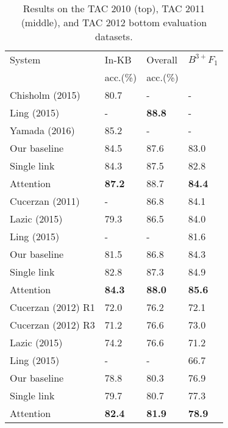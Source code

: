 \begin{table}[t!]
\centering
\begin{tabular}{l|l|l|l}
 System & In-KB & Overall & {\small ${B^{3+}F_1}$} \\ 
 & acc.(\%) & acc.(\%) & \\
\hline
\hline
Chisholm (2015) & 80.7& - & - \\
Ling (2015) & - & {\bf 88.8} & - \\
Yamada (2016)&  85.2 & - & - \\
  Our baseline & 84.5 & 87.6 & 83.0 \\
 Single link & 84.3 & 87.5 & 82.8\\
 Attention & {\bf 87.2} & {88.7} & {\bf 84.4} \\
\hline \hline
Cucerzan (2011) & - & 86.8 &  84.1 \\
Lazic (2015) & 79.3 & 86.5 & 84.0 \\
Ling (2015) &- & - & 81.6 \\
Our baseline & 81.5 & 86.8 & 84.3 \\
Single link & 82.8 & 87.3 & 84.9 \\
 Attention & {\bf 84.3} & {\bf 88.0} & {\bf 85.6} \\
\hline
\hline
Cucerzan (2012) R1 & 72.0 & 76.2 & 72.1  \\
Cucerzan (2012) R3 & 71.2 & 76.6 & 73.0 \\
Lazic (2015) & {74.2} & {76.6} & 71.2 \\
Ling (2015) & - & - & 66.7 \\
Our baseline &78.8 & 80.3 & 76.9\\
 Single link & 79.7 & {80.7} & {77.3}  \\
 Attention &{\bf 82.4} & {\bf 81.9} & {\bf 78.9} \\ \hline
\end{tabular}
\caption{Results on the TAC 2010 (top), TAC 2011 (middle), and TAC 2012 bottom evaluation datasets. \label{table:tac_results} }
\end{table}

